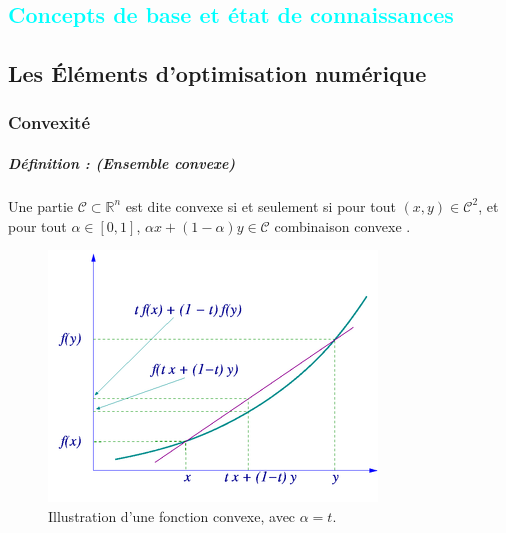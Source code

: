 
%
%

\textcolor{cyan}{\chapter{Concepts de base et état de connaissances}\label{chap:concept}}
	\section{Les Éléments d'optimisation numérique}
		\subsection{\textbf{Convexité}} \label{subsec:convex}
		\paragraph*{Définition : (Ensemble convexe)} 
		Une partie $\mathcal{C} \subset \mathbb{R}^n $ est dite convexe si et seulement si pour tout $(x,y) \in \mathcal{C}^2$, 
		et pour tout $ \alpha \in [0, 1]$,
		$ \alpha x + (1 - \alpha)y \in \mathcal{C}$ combinaison convexe \cite{jtshiman:2021}.
		
		\begin{figure}[bth]
			\centering
			\includegraphics{images/convex_function_graph.png}
			\caption[Illustration fonction convexe]{Illustration d'une fonction convexe, avec $\alpha=t$. }
			\label{fig:convexe_graph}
		\end{figure}	
		
